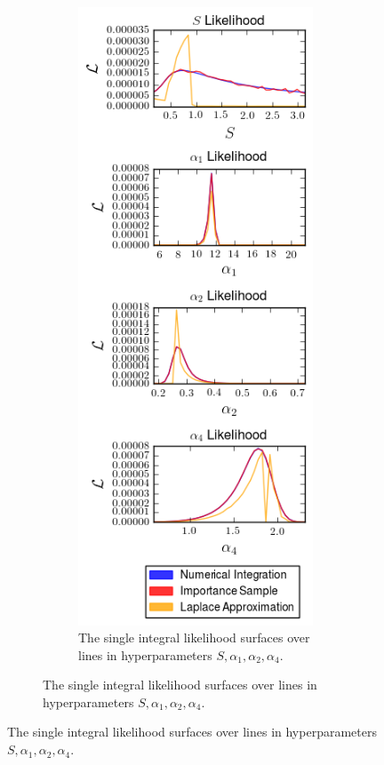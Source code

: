 \documentclass[\docopts]{\docclass}
\begin{document}
\begin{figure}[h!]
\begin{figure}[h!]
\begin{figure}[!h]
\includegraphics[width=0.8\columnwidth]{posterior_all.png}
\caption{
The single integral likelihood surfaces over lines in hyperparameters $S, \alpha_1, \alpha_2, \alpha_4$. 
\label{fig:posterior_all}}
\end{figure}


\end{figure}
\end{figure}
\end{document}
